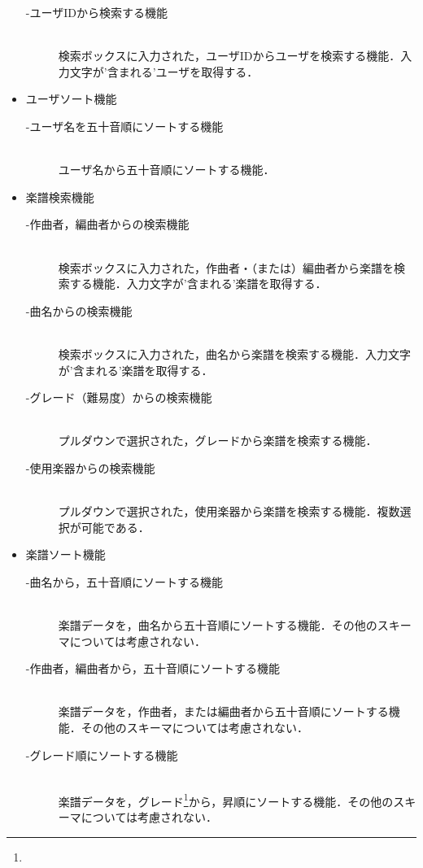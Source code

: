 \begin{itemize}
\begin{description}
        \item[-ユーザIDから検索する機能] \mbox{}\\
            検索ボックスに入力された，ユーザIDからユーザを検索する機能．入力文字が'含まれる'ユーザを取得する．
    \end{description}
    \item ユーザソート機能
    \begin{description}
        \item[-ユーザ名を五十音順にソートする機能] \mbox{}\\
            ユーザ名から五十音順にソートする機能．
    \end{description}
    \item 楽譜検索機能
    \begin{description}
        \item[-作曲者，編曲者からの検索機能]\mbox{}\\
            検索ボックスに入力された，作曲者・（または）編曲者から楽譜を検索する機能．入力文字が'含まれる'楽譜を取得する．
        \item[-曲名からの検索機能] \mbox{}\\
            検索ボックスに入力された，曲名から楽譜を検索する機能．入力文字が'含まれる'楽譜を取得する．
        \item[-グレード（難易度）からの検索機能] \mbox{}\\
            プルダウンで選択された，グレードから楽譜を検索する機能．
        \item[-使用楽器からの検索機能] \mbox{}\\
            プルダウンで選択された，使用楽器から楽譜を検索する機能．複数選択が可能である．
    \end{description}
    \item 楽譜ソート機能
    \begin{description}
        \item[-曲名から，五十音順にソートする機能]\mbox{}\\
            楽譜データを，曲名から五十音順にソートする機能．その他のスキーマについては考慮されない．
        \item[-作曲者，編曲者から，五十音順にソートする機能] \mbox{}\\
            楽譜データを，作曲者，または編曲者から五十音順にソートする機能．その他のスキーマについては考慮されない．
        \item[-グレード順にソートする機能] \mbox{}\\
            楽譜データを，グレード\footnote[1]{}から，昇順にソートする機能．その他のスキーマについては考慮されない．

\end{description}
\end{itemize}
